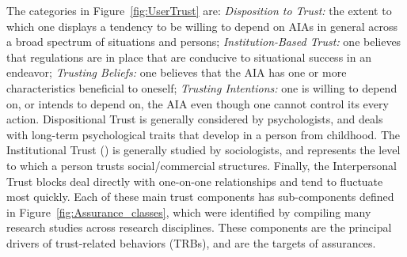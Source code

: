 The categories in Figure~\ref{fig:UserTrust} are: \textit{Disposition to Trust:} the extent to which one displays a tendency to be willing to depend on AIAs in general across a broad spectrum of situations and persons; \textit{Institution-Based Trust:} one believes that regulations are in place that are conducive to situational success in an endeavor; \textit{Trusting Beliefs:} one believes that the AIA has one or more characteristics beneficial to oneself; \textit{Trusting Intentions:} one is willing to depend on, or intends to depend on, the AIA even though one cannot control its every action. Dispositional Trust is generally considered by psychologists, and deals with long-term psychological traits that develop in a person from childhood. The Institutional Trust () is generally studied by sociologists, and represents the level to which a person trusts social/commercial structures. Finally, the Interpersonal Trust blocks deal directly with one-on-one relationships and tend to fluctuate most quickly. %
%
%
Each of these main trust components has sub-components defined in Figure~\ref{fig:Assurance_classes}, which were identified by compiling many research studies across research disciplines. %
These components are the principal drivers of trust-related behaviors (TRBs), and are the targets of assurances. %

